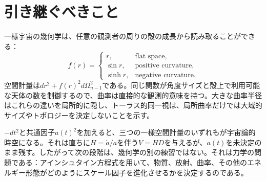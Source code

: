 \begin{classroomqa}
\end{classroomqa}

\section{引き継ぐべきこと}

一様宇宙の幾何学は、任意の観測者の周りの殻の成長から読み取ることができる：
\begin{equation}
f(r)=
\begin{cases}
r, & \text{flat space},\\
\sin r, & \text{positive curvature},\\
\sinh r, & \text{negative curvature}.
\end{cases}
\end{equation}
空間計量は\(dr^2+f(r)^2d\Omega_{n-1}^2\)である。同じ関数が角度サイズと殻上で利用可能な天体の数を制御するので、曲率は直接的な観測的意味を持つ。大きな曲率半径はこれらの違いを局所的に隠し、トーラス的同一視は、局所曲率だけでは大域的サイズやトポロジーを決定しないことを示す。

\(-dt^2\)と共通因子\(a(t)^2\)を加えると、三つの一様空間計量のいずれもが宇宙論的時空になる。それは直ちに\(H=\dot a/a\)を伴う\(V=HD\)を与えるが、\(a(t)\)を未決定のまま残す。したがって次の段階は、幾何学の別の練習ではない。それは力学の問題である：アインシュタイン方程式を用いて、物質、放射、曲率、その他のエネルギー形態がどのようにスケール因子を進化させるかを決定するのである。

